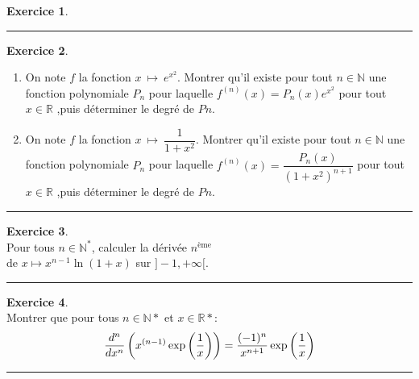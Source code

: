 \documentclass[a4paper,10pt]{article}
\theoremstyle{definition}
\theoremstyle{definition}
\newtheorem{exo}{Exercice}
\newcommand{\R}{\mathbb{R}}
\newcommand{\N}{\mathbb{N}}
\begin{document}
\begin{minipage}{1\linewidth}
\begin{minipage}[t]{0.48\linewidth}
\begin{exo}
\centering\rule{1\linewidth}{0.6pt}
\end{exo}








\end{minipage}	
\hfill\vrule\hfill
\begin{minipage}[t]{0.48\linewidth}
\raggedright



\begin{exo}\quad\\
\begin{enumerate}
\item On note $f$ la fonction $x \ \mapsto \ e^{x^2}$. Montrer qu’il existe pour tout $n\in\N$ une fonction polynomiale $P_n$ pour laquelle $f^{(n)}(x) = P_ n(x)e^{x^2}$ pour tout $x\in\R$ ,puis déterminer le degré de $Pn$.
\item  On note $f$ la fonction $x \ \mapsto \ \dfrac{1}{1+x^2} $. Montrer qu’il existe pour tout $n\in\N$ une fonction polynomiale $P_n$ pour laquelle $f^{(n)}(x) = \dfrac{P_ n(x)}{(1+x^2)^{n+1}}$ pour tout $x\in\R$ ,puis déterminer le degré de $Pn$.
\end{enumerate}
\centering\rule{1\linewidth}{0.6pt}
\end{exo}

\begin{exo}\quad\\
Pour tous $n\in\N^*$, calculer la dérivée $n^{\text{ème}}$ \\de $x \mapsto  x^{n-1}\ln(1+x)$ sur $]-1,+\infty[$.

\centering\rule{1\linewidth}{0.6pt}
\end{exo}

\begin{exo}\quad\\
Montrer que pour tous $n\in\N*$ et $x\in\R*$:
$$\dfrac{d^n}{dx^n}\left(x^{(n-1)} \exp\left(\tiny\dfrac{1}{x}\right)\right) = \dfrac{(-1)^n}{x^{n+1}} \exp\left(\tiny\dfrac{1}{x}\right)$$

\centering\rule{1\linewidth}{0.6pt}
\end{exo}






\end{minipage}
\end{minipage}
\end{document}
